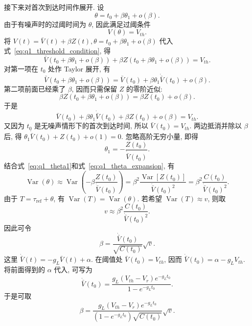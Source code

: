 ﻿\documentclass[UTF8,  zihao=-4]{ctexart}
\begin{document}
接下来对首次到达时间作展开. 设
\begin{equation}
    \label{eq:q1_theta_expansion}
    \theta=t_0+\beta \theta_1+o(\beta).
\end{equation}
由于有噪声时的过阈时间为 \(\theta\),  因此满足过阈条件
\begin{equation}
    \label{eq:q1_threshold_condition}
    V(\theta)=V_{th}.
\end{equation}
将
$
    V(t)=\bar V(t)+\beta Z(t), 
    \theta=t_0+\beta\theta_1+o(\beta)
$
代入式~\eqref{eq:q1_threshold_condition},  得
\[
    \bar V(t_0+\beta\theta_1+o(\beta))
    +
    \beta Z(t_0+\beta\theta_1+o(\beta))
    =
    V_{th}.
\]
对第一项在 \(t_0\) 处作 Taylor 展开,  有
\[
    \bar V(t_0+\beta\theta_1+o(\beta))
    =
    \bar V(t_0)
    +
    \beta\theta_1\dot{\bar V}(t_0)
    +
    o(\beta).
\]
第二项前面已经乘了 \(\beta\),  因而只需保留 \(Z\) 的零阶近似:
\[
    \beta Z(t_0+\beta\theta_1+o(\beta))
    =
    \beta Z(t_0)+o(\beta).
\]
于是
\[
    \bar V(t_0)
    +
    \beta\theta_1\dot{\bar V}(t_0)
    +
    \beta Z(t_0)
    +
    o(\beta)
    =
    V_{th}.
\]
又因为 \(t_0\) 是无噪声情形下的首次到达时间,  所以
\(\bar V(t_0)=V_{th}\). 两边抵消并除以 \(\beta\) 后,  得
$
    \theta_1\dot{\bar V}(t_0)+Z(t_0)+o(1)=0.
$
忽略高阶无穷小量,  即得
\begin{equation}
    \label{eq:q1_theta1}
    \theta_1=-\frac{Z(t_0)}{\dot{\bar V}(t_0)}.
\end{equation}
结合式~\eqref{eq:q1_theta1}和式~\eqref{eq:q1_theta_expansion},  有
\[
    \operatorname{Var}(\theta)
\approx
\operatorname{Var}\left(
-\beta\frac{Z(t_0)}{\dot{\bar V}(t_0)}
\right)
    =
    \beta^2
    \frac{\operatorname{Var}[Z(t_0)]}
    {\dot{\bar V}(t_0)^2}
    =
    \beta^2
    \frac{C(t_0)}
    {\dot{\bar V}(t_0)^2}.
\]
由于 \(T=\tau_{\mathrm{ref}}+\theta\),  有 \(\operatorname{Var}(T)=\operatorname{Var}(\theta)\). 若希望 \(\operatorname{Var}(T)\approx v\),  则取
\[
    v
    \approx
    \beta^2
    \frac{C(t_0)}
    {\dot{\bar V}(t_0)^2}.
\]
因此可令
\[
    \beta
    =
    \frac{\dot{\bar V}(t_0)}{\sqrt{C(t_0)}}\sqrt{v}.
\]
这里
$
    \dot{\bar V}(t)=-g_L\bar V(t)+\alpha.
$
在阈值处 \(\bar V(t_0)=V_{th}\),  因而
$
    \dot{\bar V}(t_0)=\alpha-g_LV_{th}.
$
将前面得到的 \(\alpha\) 代入,  可写为
\[
    \dot{\bar V}(t_0)
    =
    \frac{
    g_L(V_{th}-V_r)e^{-g_Lt_0}
    }
    {
    1-e^{-g_Lt_0}
    }.
\]
于是可取
\[
    \beta
    =
    \frac{
    g_L(V_{th}-V_r)e^{-g_Lt_0}
    }
    {
    \left(1-e^{-g_Lt_0}\right)\sqrt{C(t_0)}
    }
    \sqrt{v}.
\]
\end{document}
